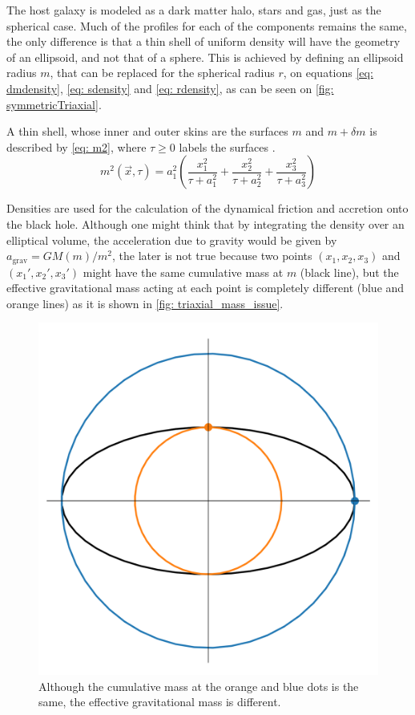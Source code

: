 		The host galaxy is modeled as a dark matter halo, stars and gas, just as the spherical case. Much of the profiles for each of the components remains the same, the only difference is that a thin shell of uniform density will have the geometry of an ellipsoid, and not that of a sphere. This is achieved by defining an ellipsoid radius $m$, that can be replaced for the spherical radius $r$, on equations \ref{eq: dmdensity}, \ref{eq: sdensity} and \autoref{eq: rdensity}, as can be seen on \autoref{fig: symmetricTriaxial}. 
		
		A thin shell, whose inner and outer skins are the surfaces $m$ and $m + \delta m$ is described by \autoref{eq: m2}, where $\tau \geq 0$ labels the surfaces \cite{binney2011galactic}.
		\begin{equation}\label{eq: m2}
		m^2(\vec{x}, \tau) = a_1^2\left(\frac{x_1^{2}}{\tau + a_{1}^{2}} + \frac{x_2^{2}}{\tau + a_{2}^{2}} + \frac{x_3^{2}}{\tau + a_{3}^{2}}\right)
		\end{equation}
		
		Densities are used for the calculation of the dynamical friction and accretion onto the black hole. Although one might think that by integrating the density over an elliptical volume, the acceleration due to gravity would be given by $a_\text{grav} = GM(m)/m^2$, the later is not true because two points $(x_1, x_2, x_3)$ and $(x_1', x_2', x_3')$ might have the same cumulative mass at $m$ (black line), but the effective gravitational mass acting at each point is completely different (blue and orange lines) as it is shown in \autoref{fig: triaxial_mass_issue}.
		\begin{figure}[h]
			\centering
			\includegraphics[width = 0.4\linewidth]{"../Files/Week 7/triaxial_mass_issue"}
			\caption{Although the cumulative mass at the orange and blue dots is the same, the effective gravitational mass is different.}
			\label{fig: triaxial_mass_issue}
		\end{figure}
	
